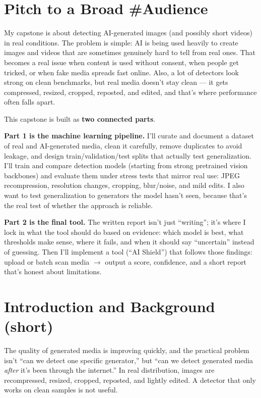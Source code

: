 \documentclass[11pt]{article}
\begin{document}
\tableofcontents
\newpage

\section{Pitch to a Broad \#Audience}

My capstone is about detecting AI-generated images (and possibly short videos) in real conditions. The problem is simple: AI is being used heavily to create images and videos that are sometimes genuinely hard to tell from real ones. That becomes a real issue when content is used without consent, when people get tricked, or when fake media spreads fast online. Also, a lot of detectors look strong on clean benchmarks, but real media doesn’t stay clean --- it gets compressed, resized, cropped, reposted, and edited, and that’s where performance often falls apart.

This capstone is built as \textbf{two connected parts}.

\textbf{Part 1 is the machine learning pipeline.} I’ll curate and document a dataset of real and AI-generated media, clean it carefully, remove duplicates to avoid leakage, and design train/validation/test splits that actually test generalization. I’ll train and compare detection models (starting from strong pretrained vision backbones) and evaluate them under stress tests that mirror real use: JPEG recompression, resolution changes, cropping, blur/noise, and mild edits. I also want to test generalization to generators the model hasn’t seen, because that’s the real test of whether the approach is reliable.

\textbf{Part 2 is the final tool.} The written report isn’t just “writing”; it’s where I lock in what the tool should do based on evidence: which model is best, what thresholds make sense, where it fails, and when it should say ``uncertain'' instead of guessing. Then I’ll implement a tool (“AI Shield”) that follows those findings: upload or batch scan media $\rightarrow$ output a score, confidence, and a short report that’s honest about limitations.

\section{Introduction and Background (short)}

The quality of generated media is improving quickly, and the practical problem isn’t “can we detect one specific generator,” but “can we detect generated media \emph{after} it’s been through the internet.” In real distribution, images are recompressed, resized, cropped, reposted, and lightly edited. A detector that only works on clean samples is not useful.
\end{document}
